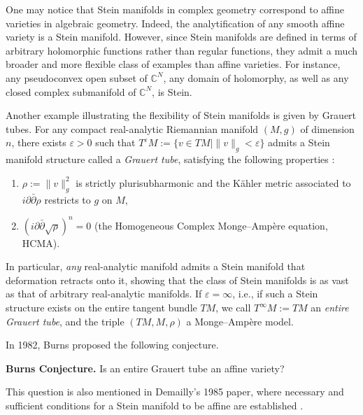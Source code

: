 \documentclass[a4paper, 12pt]{article}
\newcommand{\idd}{i\partial\bar\partial}
\begin{document}
One may notice that Stein manifolds in complex geometry correspond to affine varieties in algebraic geometry. Indeed, the analytification of any smooth affine variety is a Stein manifold. However, since Stein manifolds are defined in terms of arbitrary holomorphic functions rather than regular functions, they admit a much broader and more flexible class of examples than affine varieties. For instance, any pseudoconvex open subset of $\mathbb{C}^N$, any domain of holomorphy, as well as any closed complex submanifold of $\mathbb{C}^N$, is Stein.

Another example illustrating the flexibility of Stein manifolds is given by Grauert tubes. For any compact real-analytic Riemannian manifold $(M,g)$ of dimension $n$, there exists $\varepsilon > 0$ such that $T^\varepsilon M := \{ v \in TM \mid \|v\|_g < \varepsilon \}$ admits a Stein manifold structure called a \emph{Grauert tube}, satisfying the following properties \cite{LS91, S91, GS91, BHH03}:
\begin{enumerate}
\item $\rho := \|v\|_g^2$ is strictly plurisubharmonic and the K\"ahler metric associated to $\idd\rho$ restricts to $g$ on $M$,
\item $(i\partial\bar{\partial} \sqrt{\rho})^n = 0$ (the Homogeneous Complex Monge--Amp\`ere equation, HCMA).
\end{enumerate}
In particular, \emph{any} real-analytic manifold admits a Stein manifold that deformation retracts onto it, showing that the class of Stein manifolds is as vast as that of arbitrary real-analytic manifolds. If $\varepsilon = \infty$, i.e., if such a Stein structure exists on the entire tangent bundle $TM$, we call $T^\infty M := TM$ an \emph{entire Grauert tube}, and the triple $(TM, M, \rho)$ a Monge--Amp\`ere model.

In 1982, Burns \cite{B82} proposed the following conjecture.

\medskip

\noindent
\textbf{Burns Conjecture.} Is an entire Grauert tube an affine variety?

\medskip


This question is also mentioned in Demailly's 1985 paper, where necessary and sufficient conditions for a Stein manifold to be affine are established \cite[Probl\`eme 9.3]{D85}.
\end{document}
